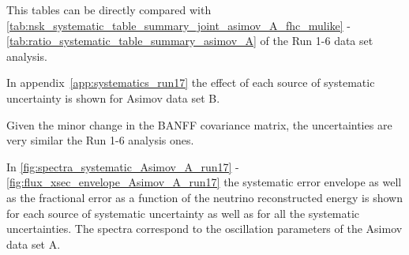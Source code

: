 This tables can be directly compared with \cref{tab:nsk_systematic_table_summary_joint_asimov_A_fhc_mulike} -
\ref{tab:ratio_systematic_table_summary_asimov_A} of the Run 1-6 data set analysis.

In appendix~\ref{app:systematics_run17} the effect of each source of systematic uncertainty 
is shown for Asimov data set B.

Given the minor change in the BANFF covariance matrix, the uncertainties are very similar
the Run 1-6 analysis ones.




\clearpage



In \cref{fig:spectra_systematic_Asimov_A_run17} - \ref{fig:flux_xsec_envelope_Asimov_A_run17}
the systematic error envelope as well as the fractional error as a function of the
neutrino reconstructed energy is shown for each source of systematic uncertainty
as well as for all the systematic uncertainties. 
The spectra correspond to the oscillation parameters of the Asimov data set A.


